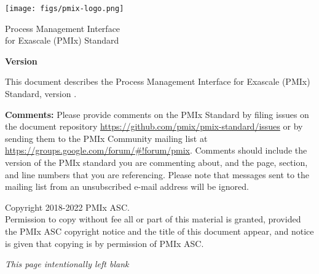 
  \begin{titlepage}
    \begin{flushleft}
     \hspace{-6em} \texttt{[image: figs/pmix-logo.png]}
    \end{flushleft}

    \begin{adjustwidth}{-0.75in}{0in}
    \begin{center}
      \Huge
      \textsf{Process Management Interface\\for Exascale (PMIx) Standard}

      \vspace{1.0in}
	  \huge
      \textbf{Version \VER{}}

      \vspace{0.15in}
	  \Large
      \textbf{\VERDATE}

    \end{center}
    \end{adjustwidth}

    \vspace{1.2in}

\par
This document describes the Process Management Interface for Exascale (PMIx) Standard, version \VER{}.

\par
\textbf{Comments:}
Please provide comments on the PMIx Standard by filing issues on the document repository \url{https://github.com/pmix/pmix-standard/issues} or by sending them to the PMIx Community mailing list at \url{https://groups.google.com/forum/#!forum/pmix}.
Comments should include the version of the PMIx standard you are commenting about, and the page, section, and line numbers that you are referencing.
Please note that messages sent to the mailing list from an unsubscribed e-mail address will be ignored.

\vfill

\begin{adjustwidth}{0pt}{1em}\setlength{\parskip}{0.25\baselineskip}%
Copyright \textsuperscript{\textcopyright} 2018-2022 PMIx \acf{ASC}.\\
Permission to copy without fee all or part of this material is granted,
provided the PMIx \ac{ASC} copyright notice and
the title of this document appear, and notice is given that copying is by
permission of PMIx \ac{ASC}.
\end{adjustwidth}

  \end{titlepage}

\clearpage
\thispagestyle{empty}
\phantom{a}
\begin{center}
\emph{This page intentionally left blank}
\end{center}

\vfill

